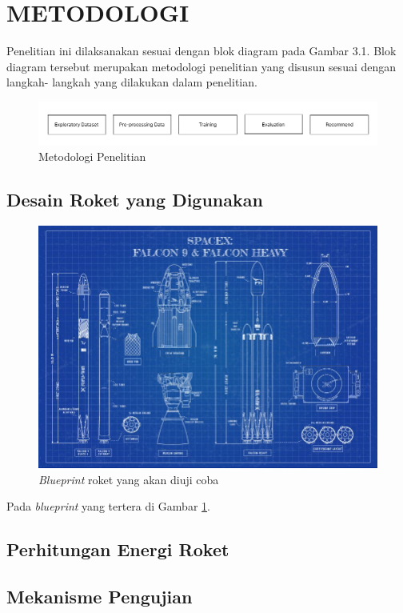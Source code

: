 \section{METODOLOGI}

Penelitian ini dilaksanakan sesuai dengan blok diagram pada Gambar 3.1. Blok
diagram tersebut merupakan metodologi penelitian yang disusun sesuai dengan langkah-
langkah yang dilakukan dalam penelitian.

\begin{figure} [ht] \centering
  \includegraphics[width=160mm]{gambar/metodologi.png}
  \caption{Metodologi Penelitian}
\end{figure}

\subsection{Desain Roket yang Digunakan}


\begin{figure} [ht] \centering
  \includegraphics[scale=0.45]{gambar/blueprint.jpg}
  \caption{\emph{Blueprint} roket yang akan diuji coba \citep{SpaceXBlueprint}}
  \label{fig:Blueprint}
\end{figure}

Pada \emph{blueprint} yang tertera di Gambar \ref{fig:Blueprint}. \lipsum[12]

\subsection{Perhitungan Energi Roket}

\lipsum[13]

\subsection{Mekanisme Pengujian}

\lipsum[14]
